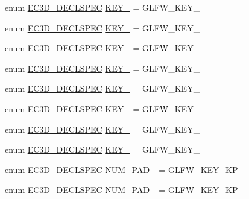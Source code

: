 \begin{DoxyCompactItemize}
\item 
enum \mbox{\hyperlink{_common_8h_aac42573e202ca3dd4d259c81691e2369}{E\+C3\+D\+\_\+\+D\+E\+C\+L\+S\+P\+EC}} \mbox{\hyperlink{classec_1_1_keyboard_a99f6daf979b958338ab99f6c4d89dcf0}{K\+E\+Y\+\_}} = G\+L\+F\+W\+\_\+\+K\+E\+Y\+\_
\item 
enum \mbox{\hyperlink{_common_8h_aac42573e202ca3dd4d259c81691e2369}{E\+C3\+D\+\_\+\+D\+E\+C\+L\+S\+P\+EC}} \mbox{\hyperlink{classec_1_1_keyboard_a99d867703644def144395a8d141b26b0}{K\+E\+Y\+\_}} = G\+L\+F\+W\+\_\+\+K\+E\+Y\+\_
\item 
enum \mbox{\hyperlink{_common_8h_aac42573e202ca3dd4d259c81691e2369}{E\+C3\+D\+\_\+\+D\+E\+C\+L\+S\+P\+EC}} \mbox{\hyperlink{classec_1_1_keyboard_adfac2e411700401affa8df6153681da6}{K\+E\+Y\+\_}} = G\+L\+F\+W\+\_\+\+K\+E\+Y\+\_
\item 
enum \mbox{\hyperlink{_common_8h_aac42573e202ca3dd4d259c81691e2369}{E\+C3\+D\+\_\+\+D\+E\+C\+L\+S\+P\+EC}} \mbox{\hyperlink{classec_1_1_keyboard_a3ac330b34232272a1c8efa88d31977c4}{K\+E\+Y\+\_}} = G\+L\+F\+W\+\_\+\+K\+E\+Y\+\_
\item 
enum \mbox{\hyperlink{_common_8h_aac42573e202ca3dd4d259c81691e2369}{E\+C3\+D\+\_\+\+D\+E\+C\+L\+S\+P\+EC}} \mbox{\hyperlink{classec_1_1_keyboard_af3637c105dc23dacf0de62d1a286c10f}{K\+E\+Y\+\_}} = G\+L\+F\+W\+\_\+\+K\+E\+Y\+\_
\item 
enum \mbox{\hyperlink{_common_8h_aac42573e202ca3dd4d259c81691e2369}{E\+C3\+D\+\_\+\+D\+E\+C\+L\+S\+P\+EC}} \mbox{\hyperlink{classec_1_1_keyboard_a2ce1aa1beb0123b243b1a4e5a6c8b5b6}{K\+E\+Y\+\_}} = G\+L\+F\+W\+\_\+\+K\+E\+Y\+\_
\item 
enum \mbox{\hyperlink{_common_8h_aac42573e202ca3dd4d259c81691e2369}{E\+C3\+D\+\_\+\+D\+E\+C\+L\+S\+P\+EC}} \mbox{\hyperlink{classec_1_1_keyboard_ace0785fe5a1e11023c7a7cfa9791c527}{K\+E\+Y\+\_}} = G\+L\+F\+W\+\_\+\+K\+E\+Y\+\_
\item 
enum \mbox{\hyperlink{_common_8h_aac42573e202ca3dd4d259c81691e2369}{E\+C3\+D\+\_\+\+D\+E\+C\+L\+S\+P\+EC}} \mbox{\hyperlink{classec_1_1_keyboard_a69b51ba3fb41b7b5afde5e3f3bab4f9c}{K\+E\+Y\+\_}} = G\+L\+F\+W\+\_\+\+K\+E\+Y\+\_
\item 
enum \mbox{\hyperlink{_common_8h_aac42573e202ca3dd4d259c81691e2369}{E\+C3\+D\+\_\+\+D\+E\+C\+L\+S\+P\+EC}} \mbox{\hyperlink{classec_1_1_keyboard_a2b29fb796ac7f5ae647dd636a796a91d}{N\+U\+M\+\_\+\+P\+A\+D\+\_}} = G\+L\+F\+W\+\_\+\+K\+E\+Y\+\_\+\+K\+P\+\_
\item 
enum \mbox{\hyperlink{_common_8h_aac42573e202ca3dd4d259c81691e2369}{E\+C3\+D\+\_\+\+D\+E\+C\+L\+S\+P\+EC}} \mbox{\hyperlink{classec_1_1_keyboard_a36b3b138bb5132950f91956e5c0a9676}{N\+U\+M\+\_\+\+P\+A\+D\+\_}} = G\+L\+F\+W\+\_\+\+K\+E\+Y\+\_\+\+K\+P\+\_

\end{DoxyCompactItemize}
